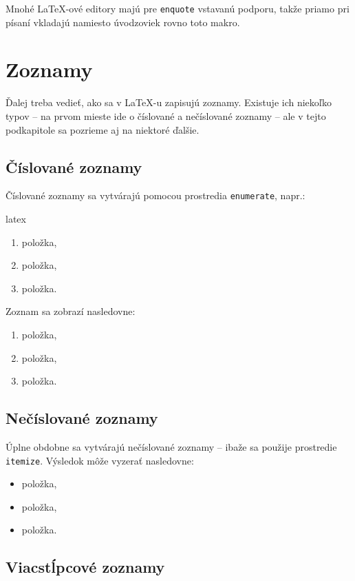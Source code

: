 Mnohé LaTeX-ové editory majú pre \texttt{enquote} vstavanú podporu, takže priamo pri písaní vkladajú namiesto úvodzoviek rovno toto makro.

\section{Zoznamy}

Ďalej treba vedieť, ako sa v LaTeX-u zapisujú zoznamy. Existuje ich niekoľko typov -- na prvom mieste ide o číslované a nečíslované zoznamy -- ale v tejto podkapitole sa pozrieme aj na niektoré ďalšie.

\subsection{Číslované zoznamy}

Číslované zoznamy sa vytvárajú pomocou prostredia \texttt{enumerate}, napr.:
\begin{inlinecode}{latex}
\begin{enumerate}
\item položka,
\item položka,
\item položka.
\end{enumerate}
\end{inlinecode}

Zoznam sa zobrazí nasledovne:
\begin{enumerate}
\item položka,
\item položka,
\item položka.
\end{enumerate}

\subsection{Nečíslované zoznamy}

Úplne obdobne sa vytvárajú nečíslované zoznamy -- ibaže sa použije prostredie \texttt{itemize}. Výsledok môže vyzerať nasledovne:
\begin{itemize}
\item položka,
\item položka,
\item položka.
\end{itemize}

\subsection{Viacstĺpcové zoznamy}

